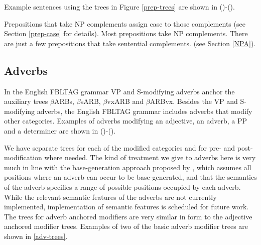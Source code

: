 Example sentences using the trees in Figure \ref{prep-trees} are shown
in ()-().\\




Prepositions that take NP complements assign case to those complements (see
Section \ref{prep-case} for details).  Most prepositions take NP complements.
There are just a few prepositions that take sentential complements. (see Section \ref{NPA}).



\subsection{Adverbs}
\label{adv-modifier}

In the English FBLTAG grammar VP and S-modifying adverbs anchor the
auxiliary trees $\beta$ARBs, $\beta$sARB, $\beta$vxARB and $\beta$ARBvx.
Besides the VP and S-modifying adverbs, the English FBLTAG grammar includes
adverbs that modify other categories. Examples of adverbs modifying
an adjective, an adverb, a PP and a determiner are shown in ()-(). 


We have separate trees for each of the modified categories and for
pre- and post-modification where needed.  The kind of treatment we
give to adverbs here is very much in line with the base-generation
approach proposed by \cite{Ernst84}, which assumes all positions where
an adverb can occur to be base-generated, and that the semantics of
the adverb specifies a range of possible positions occupied by each
adverb. While the relevant semantic features of the adverbs are not
currently implemented, implementation of semantic features is
scheduled for future work.  The trees for adverb anchored modifiers
are very similar in form to the adjective anchored modifier trees.
Examples of two of the basic adverb modifier trees are shown in
\ref{adv-trees}.

